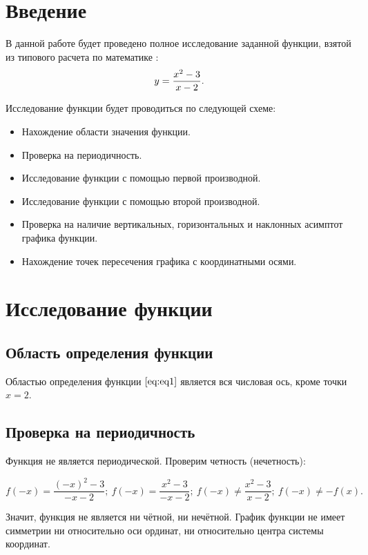 \section*{Введение}

В данной работе будет проведено полное исследование заданной функции, взятой из типового расчета по математике \cite{tip}: 
\begin{equation}
    \centering
    \label{eq:eq1}
    y = \frac{x^2-3}{x-2}.
\end{equation}

 Исследование функции будет проводиться по следующей схеме:
\begin{itemize}
    \item Нахождение области значения функции.
    \item Проверка на периодичность.
    \item Исследование функции с помощью первой производной.
    \item Исследование функции с помощью второй производной.
    \item Проверка на наличие вертикальных, горизонтальных и наклонных асимптот графика функции.
    \item Нахождение точек пересечения графика с координатными осями.
\end{itemize}


\newpage
\section{Исследование функции}

\subsection{Область определения функции}

Областью определения функции $\eqref{eq:eq1}$ является вся числовая ось, кроме точки $x = 2$.

\subsection{Проверка на периодичность}

Функция не является периодической. Проверим четность (нечетность):

\[f(-x) = \frac{(-x)^2-3}{-x-2} ;\ f(-x) = \frac{x^2-3}{-x-2} ;\ f(-x) \neq \frac{x^2-3}{x-2} ;\ f(-x) \neq -f(x).\]

Значит, функция не является ни чётной, ни нечётной. График функции не
имеет симметрии ни относительно оси ординат, ни относительно центра
системы координат.

